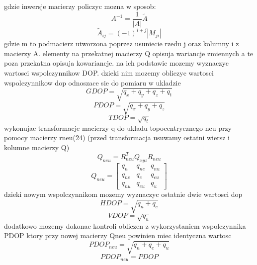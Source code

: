\documentclass[twocolumn]{article}
\begin{document}
gdzie inwersje macierzy policzyc mozna w sposob:
\begin{equation}
A^{-1}=\frac{1}{|A|}\tilde{A}
\end{equation}
\begin{equation}
\tilde{A}_{ij} = (-1)^{i+j}|M_{ji}|
\end{equation}
gdzie m to podmacierz utworzona poprzez usuniecie rzedu j oraz kolumny i z macierzy A. elementy na przekatnej macierzy Q opisuja wariancje zmiennych a te poza przekatna opisuja kowariancje. na ich podstawie mozemy wyznaczyc wartosci wspolczynnikow DOP. dzieki nim mozemy obliczyc wartosci wspolczynnikow dop odnoszace sie do pomiaru w ukladzie %
\begin{equation}
GDOP = \sqrt{q_x+q_y+q_z+q_t}
\end{equation}
\begin{equation}
PDOP = \sqrt{q_x+q_y+q_z}
\end{equation}
\begin{equation}
TDOP = \sqrt{q_t}
\end{equation}
wykonujac transformacje macierzy q do ukladu topocentrycznego neu przy pomocy macierzy rneu(24) (przed transformacja usuwamy ostatni wiersz i kolumne macierzy Q)
\begin{equation}
Q_{neu}=R_{neu}^TQ_{xyz}R_{neu}
\end{equation}
\begin{equation}
Q_{neu} =
\begin{bmatrix}
    q_{n} & q_{ne} & q_{nu} \\
    q_{ne} & q_{e} & q_{eu} \\
    q_{nu} & q_{eu} & q_{u}
\end{bmatrix}
\end{equation}
dzieki nowym wspolczynnikom mozemy wyznaczyc ostatnie dwie wartosci dop
\begin{equation}
HDOP = \sqrt{q_n+q_e}
\end{equation}
\begin{equation}
VDOP = \sqrt{q_u}
\end{equation}
dodatkowo mozemy dokonac kontroli obliczen z wykorzystaniem wspolczynnika PDOP ktory przy nowej macierzy Qneu powinien miec identyczna wartosc
\begin{equation}
PDOP_{neu} = \sqrt{q_n+q_e+q_u}
\end{equation}
\begin{equation}
PDOP_{neu} = PDOP
\end{equation}
\end{document}
